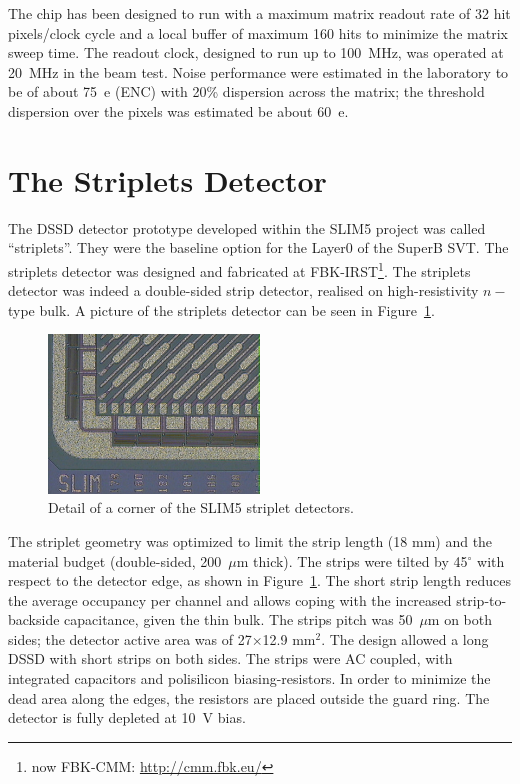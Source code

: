 The chip has been designed to run with a maximum matrix readout rate of 32 hit pixels/clock cycle and 
a local buffer of maximum 160 hits to minimize the matrix sweep time.
The readout clock, designed to run up to 100~MHz, was operated at 20~MHz in the beam test.
Noise performance were estimated in the laboratory to be of about 75~e (ENC) with 20\% dispersion 
across the matrix; the threshold dispersion over the pixels was estimated be about 60~e.

\section{The Striplets Detector}
\label{sec:Striplets}

The DSSD detector prototype  developed within the SLIM5 project was called ``striplets''. They 
were the baseline option for the Layer0 of the SuperB SVT.
The striplets detector was designed and fabricated at FBK-IRST\footnote{now FBK-CMM: \url{http://cmm.fbk.eu/}}.
The striplets detector was indeed a double-sided strip detector, realised on high-resistivity 
$n-$type bulk. A picture of the striplets detector can be seen in Figure~\ref{fig:striplets}.

\begin{figure}[!htpb]
\centering
\includegraphics[width=0.5\textwidth]{striplets.jpg}
\caption{\label{fig:striplets} Detail of a corner of the SLIM5 striplet detectors.}
\end{figure}

The striplet geometry was optimized to limit the strip length (18 mm) and the material budget 
(double-sided, 200~$\mu$m thick). The strips were tilted by 45$^{\circ}$ with respect to the 
detector edge, as shown in Figure~\ref{fig:striplets}. The short strip length reduces the average 
occupancy per channel and allows coping with the increased strip-to-backside capacitance, given 
the thin bulk. The strips pitch was 50~$\mu$m on both sides; the detector active area was 
of 27$\times$12.9 mm$^2$. The design allowed a long DSSD with short strips on both sides.
The strips were AC coupled, with integrated capacitors and polisilicon biasing-resistors. 
In order to minimize the dead area along the edges, the resistors are placed outside the guard ring. 
The detector is fully depleted at 10~V bias.

